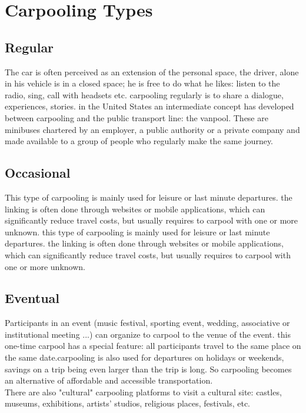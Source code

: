 \section{Carpooling Types}
\subsection{Regular}
The car is often perceived as an extension of the personal space, the driver, alone in his vehicle is in a closed space; he is free to do what he likes: listen to the radio, sing, call with headsets etc. carpooling regularly is to share a dialogue, experiences, stories. in the United States an intermediate concept has developed between carpooling and the public transport line: the vanpool. These are minibuses chartered by an employer, a public authority or a private company and made available to a group of people who regularly make the same journey.

\subsection{Occasional}
This type of carpooling is mainly used for leisure or last minute departures. the linking is often done through websites or mobile applications, which can significantly reduce travel costs, but usually requires to carpool with one or more unknown.
this type of carpooling is mainly used for leisure or last minute departures. the linking is often done through websites or mobile applications, which can significantly reduce travel costs, but usually requires to carpool with one or more unknown.

\subsection{Eventual}
Participants in an event (music festival, sporting event, wedding, associative or 
institutional meeting ...) can organize to carpool to the venue of the event. this one-time carpool has a special feature: all participants travel to the same place on the same date.carpooling is also used for departures on holidays or weekends, savings on a trip being even larger than the trip is long. So carpooling becomes an alternative of affordable and accessible transportation.
\\ There are also "cultural" carpooling platforms to visit a cultural site: castles, 
museums, exhibitions, artists' studios, religious places, festivals, etc.
